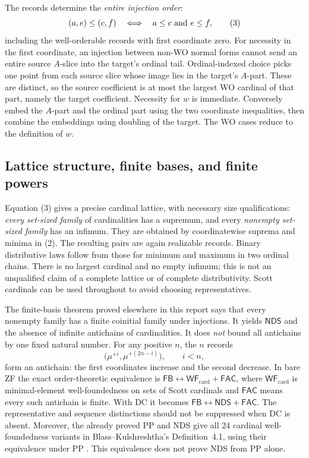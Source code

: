 The records determine the \emph{entire injection order}:
\[
            (a,e)\leq(c,f)\quad\Longleftrightarrow\quad
                         a\leq c\ \hbox{and}\ e\leq f,        \tag{3}
\]
including the well-orderable records with first coordinate zero.
For necessity in the first coordinate, an injection between non-WO
normal forms cannot send an entire source $A$-slice into the target's
ordinal tail. Ordinal-indexed choice picks one point from each source
slice whose image lies in the target's $A$-part. These are distinct,
so the source coefficient is at most the largest WO cardinal of that
part, namely the target coefficient. Necessity for $w$ is immediate.
Conversely embed the $A$-part and the ordinal part using the two coordinate
inequalities, then combine the embeddings using doubling of the target.
The WO cases reduce to the definition of $w$.

\subsection{Lattice structure, finite bases, and finite powers}

Equation (3) gives a precise cardinal lattice, with necessary size
qualifications: \emph{every set-sized family} of cardinalities has a
supremum, and every \emph{nonempty set-sized family} has an infimum.
They are obtained by coordinatewise suprema and minima in (2).
The resulting pairs are again realizable records. Binary distributive
laws follow from those for minimum and maximum in two ordinal chains.
There is no largest cardinal and no empty infimum; this is not an
unqualified claim of a complete lattice or of complete distributivity.
Scott cardinals can be used throughout to avoid choosing representatives.

The finite-basis theorem proved elsewhere in this report says that every
nonempty family has a finite coinitial family under injections. It yields
$\mathsf{NDS}$ and the absence of infinite antichains of cardinalities.
It does \emph{not} bound all antichains by one fixed natural number. For
any positive $n$, the $n$ records
\[
 \bigl(\mu^{+i},\mu^{+(2n-i)}\bigr),\qquad i<n,
\]
form an antichain: the first coordinates increase and the second decrease.
In bare ZF the exact order-theoretic equivalence is
$\mathsf{FB}\leftrightarrow\mathsf{WF}_{\mathrm{card}}+\mathsf{FAC}$,
where $\mathsf{WF}_{\mathrm{card}}$ is minimal-element well-foundedness
on sets of Scott cardinals and $\mathsf{FAC}$ means every such antichain
is finite. With DC it becomes
$\mathsf{FB}\leftrightarrow\mathsf{NDS}+\mathsf{FAC}$.
The representative and sequence distinctions should not be suppressed
when DC is absent. Moreover, the already proved PP and NDS give all
24 cardinal well-foundedness variants in Blass--Kulshreshtha's
Definition~4.1, using their equivalence under PP
\cite[Proposition 9.8]{BK}. This equivalence does not prove NDS from
PP alone.

